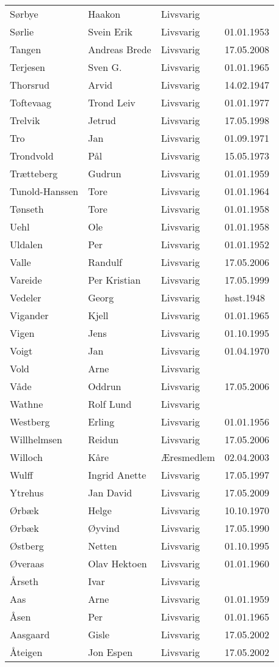 \begin{longtable}{llll}
Sørbye	&	Haakon	&	Livsvarig 	&		\\
Sørlie	&	Svein Erik	&	Livsvarig 	&	01.01.1953	\\
Tangen	&	Andreas Brede	&	Livsvarig	&	17.05.2008	\\
Terjesen	&	Sven G.	&	Livsvarig 	&	01.01.1965	\\
Thorsrud	&	Arvid	&	Livsvarig 	&	14.02.1947	\\
Toftevaag	&	Trond Leiv	&	Livsvarig 	&	01.01.1977	\\
Trelvik 	&	Jetrud	&	Livsvarig	&	17.05.1998	\\
Tro	&	Jan	&	Livsvarig 	&	01.09.1971	\\
Trondvold	&	Pål	&	Livsvarig 	&	15.05.1973	\\
Trætteberg	&	Gudrun	&	Livsvarig 	&	01.01.1959	\\
Tunold-Hanssen	&	Tore	&	Livsvarig 	&	01.01.1964	\\
Tønseth	&	Tore	&	Livsvarig 	&	01.01.1958	\\
Uehl	&	Ole	&	Livsvarig 	&	01.01.1958	\\
Uldalen	&	Per	&	Livsvarig 	&	01.01.1952	\\
Valle	&	Randulf	&	Livsvarig	&	17.05.2006	\\
Vareide 	&	Per Kristian	&	Livsvarig	&	17.05.1999	\\
Vedeler	&	Georg	&	Livsvarig	&	høst.1948	\\
Vigander	&	Kjell	&	Livsvarig 	&	01.01.1965	\\
Vigen 	&	Jens	&	Livsvarig	&	01.10.1995	\\
Voigt	&	Jan	&	Livsvarig 	&	01.04.1970	\\
Vold	&	Arne	&	Livsvarig 	&		\\
Våde	&	Oddrun	&	Livsvarig	&	17.05.2006	\\
Wathne	&	Rolf Lund	&	Livsvarig 	&		\\
Westberg	&	Erling	&	Livsvarig 	&	01.01.1956	\\
Willhelmsen	&	Reidun	&	Livsvarig	&	17.05.2006	\\
Willoch	&	Kåre	&	Æresmedlem	&	02.04.2003	\\
Wulff 	&	Ingrid Anette	&	Livsvarig	&	17.05.1997	\\
Ytrehus	&	Jan David	&	Livsvarig	&	17.05.2009	\\
Ørbæk	&	Helge	&	Livsvarig 	&	10.10.1970	\\
Ørbæk	&	Øyvind	&	Livsvarig 	&	17.05.1990	\\
Østberg 	&	Netten	&	Livsvarig	&	01.10.1995	\\
Øveraas	&	Olav Hektoen	&	Livsvarig 	&	01.01.1960	\\
Årseth	&	Ivar	&	Livsvarig 	&		\\
Aas	&	Arne	&	Livsvarig 	&	01.01.1959	\\
Åsen	&	Per	&	Livsvarig 	&	01.01.1965	\\
Aasgaard 	&	Gisle	&	Livsvarig	&	17.05.2002	\\
Åteigen 	&	Jon Espen	&	Livsvarig	&	17.05.2002	\\
    \end{longtable}


